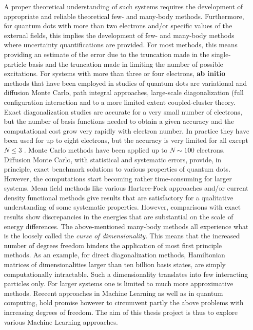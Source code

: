 \documentclass[%
oneside,                 %
final,                   %
10pt]{article}
\begin{document}
A proper theoretical understanding of such systems requires the
development of appropriate and reliable theoretical few- and many-body
methods.  Furthermore, for quantum dots with more than two electrons
and/or specific values of the external fields, this implies the
development of few- and many-body methods where uncertainty
quantifications are provided.  For most methods, this means providing
an estimate of the error due to the truncation made in the
single-particle basis and the truncation made in limiting the number
of possible excitations.  For systems with more than three or four
electrons, \textbf{ab initio} methods that have been employed in studies of
quantum dots are variational and diffusion Monte Carlo, path integral
approaches, large-scale diagonalization (full configuration
interaction and to a more limited extent coupled-cluster theory.
Exact diagonalization studies are accurate for a very small number of
electrons, but the number of basis functions needed to obtain a given
accuracy and the computational cost grow very rapidly with electron
number.  In practice they have been used for up to eight electrons,
but the accuracy is very limited for all except $N\le 3$ .  Monte
Carlo methods have been applied up to $N\sim 100$ electrons. Diffusion
Monte Carlo, with statistical and systematic errors, provide, in
principle, exact benchmark solutions to various properties of quantum
dots. However, the computations start becoming rather time-consuming
for larger systems.  Mean field methods like various Hartree-Fock
approaches and/or current density functional methods give results that
are satisfactory for a qualitative understanding of some systematic
properties. However, comparisons with exact results show discrepancies
in the energies that are substantial on the scale of energy
differences. The above-mentioned many-body methods all experience what
is the loosely called the \emph{curse of dimensionality}. This means that
the increased number of degrees freedom hinders the application of
most first principle methods. As an example, for direct
diagonalization methods, Hamiltonian matrices of dimensionalities
larger than ten billion basis states, are simply computationally
intractable. Such a dimensionality translates into few interacting
particles only. For larger systems one is limited to much more
approximative methods.  Reecent approaches in Machine Learning as well
as in quantum computing, hold promise however to circumvent partly the
above problems with increasing degrees of freedom.  The aim of this thesis project is
thus to explore various Machine Learning
approaches.
\end{document}

